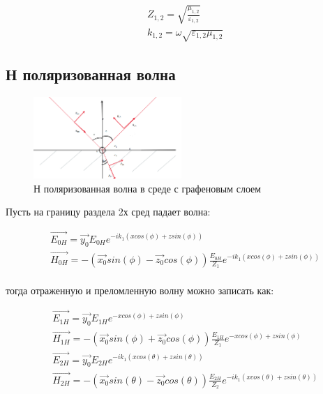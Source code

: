 	\begin{equation}
		\begin{aligned}
			&Z_{1, 2} = \sqrt{\frac{\mu_{1, 2}}{\varepsilon_{1, 2}}} \\
			&k_{1, 2} = \omega \sqrt{\varepsilon_{1, 2} \mu_{1, 2}}
		\end{aligned}
	\end{equation}
	
	\subsection{Н поляризованная волна}
	
	\begin{figure}[h] %
		\centering %
		\includegraphics[width=0.5\textwidth]{Рис 7.PNG} %
		\caption{Н поляризованная волна в среде с графеновым слоем} %
		\label{fig:example7} %
	\end{figure}
	
	Пусть на границу раздела 2х сред падает волна:
	
	\begin{equation}
		\begin{aligned}
			&\vec{E_{0H}} = \vec{y_0} E_{0H} e^{-ik_1(xcos(\phi) + zsin(\phi))} \\
			&\vec{H_{0H}} = -(\vec{x_0}sin(\phi) - \vec{z_0}cos(\phi)) \frac{E_{0H}}{Z_1}e^{-ik_1(xcos(\phi) + zsin(\phi))} \\ 
		\end{aligned}
	\end{equation}
	
	тогда отраженную и преломленную волну можно записать как:
	
	\begin{equation}
		\begin{aligned}
			&\vec{E_{1H}} = \vec{y_0}E_{1H} e^{-xcos(\phi) + zsin(\phi)} \\
			&\vec{H_{1H}} = -(\vec{x_0}sin(\phi) + \vec{z_0}cos(\phi)) \frac{E_{1H}}{Z_1} e^{-xcos(\phi) + zsin(\phi)} \\
			&\vec{E_{2H}} = \vec{y_0} E_{2H} e^{-ik_1(xcos(\theta) + zsin(\theta))} \\
			&\vec{H_{2H}} = -(\vec{x_0}sin(\theta) - \vec{z_0}cos(\theta)) \frac{E_{2H}}{Z_2}e^{-ik_1(xcos(\theta) + zsin(\theta))} \\ 
		\end{aligned}
	\end{equation}
	
